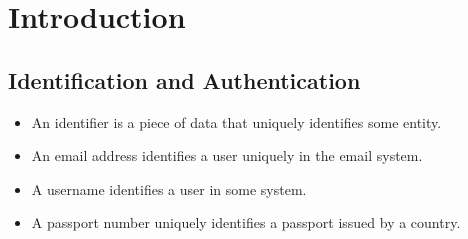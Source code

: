 \begin{frame}
  \titlepage{}
\end{frame}





\section{Introduction}

\subsection{Identification and Authentication}

\begin{frame}
  \begin{definition}[Identifier]
    \begin{itemize}
      \item An identifier is a piece of data that uniquely identifies some 
        entity.
    \end{itemize}
  \end{definition}

  \begin{example}[Identifiers]
    \begin{itemize}
      \item An email address identifies a user uniquely in the email system.
      \item A username identifies a user in some system.
      \item A passport number uniquely identifies a passport issued by 
        a country.
    \end{itemize}
  \end{example}
\end{frame}

